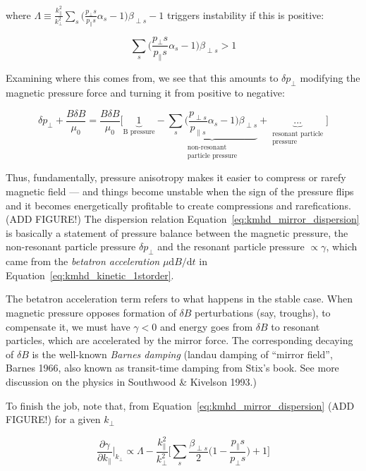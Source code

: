 \documentclass[
  notoc %
]{tufte-book}
\begin{document}
where
\(\Lambda\equiv \frac{k_\parallel^2}{k_\perp^2}\sum_s \Big(\frac{p_\perp s}{p_\parallel s}\alpha_s - 1 \Big)\beta_{\perp s} - 1\)
triggers instability if this is positive:

\[
\sum_s \Big(\frac{p_\perp s}{p_\parallel s}\alpha_s - 1 \Big)\beta_{\perp s} > 1
\]

Examining where this comes from, we see that this amounts to
\(\delta p_\perp\) modifying the magnetic pressure force and turning it
from positive to negative:

\[
\delta p_\perp + \frac{B\delta B}{\mu_0} = \frac{B\delta B}{\mu_0}\Big[ \underbrace{1}_{\text{B pressure}} - \underbrace{\sum_s\Big( \frac{p_{\perp s}}{p_{\parallel s}}\alpha_s - 1 \Big)\beta_{\perp s}}_{\substack{\text{non-resonant} \\ \text{particle pressure}}} + \underbrace{...}_{\substack{\text{resonant particle} \\ \text{pressure}}} \Big]
\]

Thus, fundamentally, pressure anisotropy makes it easier to compress or
rarefy magnetic field --- and things become unstable when the sign of
the pressure flips and it becomes energetically profitable to create
compressions and rarefications. (ADD FIGURE!) The dispersion relation
Equation~\ref{eq:kmhd_mirror_dispersion} is basically a statement of
pressure balance between the magnetic pressure, the non-resonant
particle pressure \(\delta p_\perp\) and the resonant particle pressure
\(\propto\gamma\), which came from the \emph{betatron acceleration}
\(\mu \mathrm{d}B/\mathrm{d}t\) in
Equation~\ref{eq:kmhd_kinetic_1storder}.

The betatron acceleration term refers to what happens in the stable
case. When magnetic pressure opposes formation of \(\delta B\)
perturbations (say, troughs), to compensate it, we must have
\(\gamma<0\) and energy goes from \(\delta B\) to resonant particles,
which are accelerated by the mirror force. The corresponding decaying of
\(\delta B\) is the well-known \emph{Barnes damping} (landau damping of
``mirror field'', Barnes 1966, also known as transit-time damping from
Stix's book. See more discussion on the physics in Southwood \& Kivelson
1993.)

To finish the job, note that, from
Equation~\ref{eq:kmhd_mirror_dispersion} (ADD FIGURE!) for a given
\(k_\perp\)

\[
\frac{\partial\gamma}{\partial k_\parallel}\bigg\rvert_{k_\perp} \propto \Lambda - \frac{k_\parallel^2}{k_\perp^2}\Big[\sum_s\frac{\beta_{\perp s}}{2}\Big(1-\frac{p_\parallel s}{p_\perp s} \Big) + 1 \Big]
\]
\end{document}
